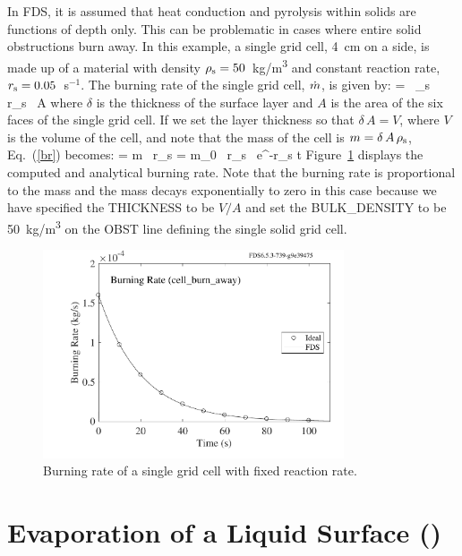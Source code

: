 \documentclass[11pt]{book}
\begin{document}
In FDS, it is assumed that heat conduction and pyrolysis within solids are functions of depth only. This can be problematic in cases where entire solid obstructions burn away. In this example, a single grid cell, 4~cm on a side, is made up of a material with density $\rho_{\rm s}=50$~\si{kg/m^3} and constant reaction rate, $r_{\rm s}=0.05$~s$^{-1}$. The burning rate of the single grid cell, $\dot{m}$, is given by:
\be
   \dm = \delta \, \rho_{\rm s} \, r_{\rm s} \, A  \label{br}
\ee
where $\delta$ is the thickness of the surface layer and $A$ is the area of the six faces of the single grid cell. If we set the layer thickness so that $\delta \, A=V$, where $V$ is the volume of the cell, and note that the mass of the cell is $m=\delta \, A \, \rho_{\rm s}$, Eq.~(\ref{br}) becomes:
\be
   \dm = m \, r_{\rm s} = m_0 \, r_{\rm s} \, {\rm e}^{-r_{\rm s} t}
\ee
Figure~\ref{cell_burn_away_fig} displays the computed and analytical burning rate. Note that the burning rate is proportional to the mass and the mass decays exponentially to zero in this case because we have specified the {\ct THICKNESS} to be $V/A$ and set the {\ct BULK\_DENSITY} to be 50~\si{kg/m^3} on the {\ct OBST} line defining the single solid grid cell.
\begin{figure}[!htb]
\centering
\includegraphics[width=3.5in]{SCRIPT_FIGURES/cell_burn_away}
\caption[The {\ct cell\_burn\_away} test case.]{Burning rate of a single grid cell with fixed reaction rate.}
\label{cell_burn_away_fig}
\end{figure}




\section{Evaporation of a Liquid Surface (\texorpdfstring{}{surf\_mass\_vent\_liquid})}
\label{surf_mass_vent_liquid_fuel}
\label{surf_mass_vent_liquid_fuel_nonconforming}
\end{document}
